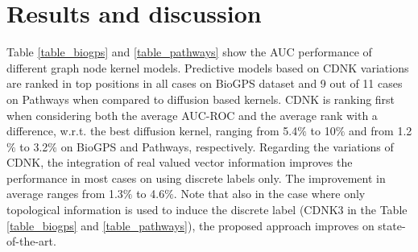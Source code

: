 \documentclass[review]{elsarticle}
\begin{document}
\section{Results and discussion}
Table \ref{table_biogps} and \ref{table_pathways} show the AUC performance of different graph node kernel models. Predictive models based on CDNK variations are ranked in top positions in all cases on BioGPS dataset and 9 out of 11 cases on Pathways when compared to diffusion based kernels. CDNK is ranking first when considering both the average AUC-ROC and the average rank with a difference, w.r.t. the best diffusion kernel, ranging from 5.4$\%$ to 10$\%$ and from 1.2$\%$ to 3.2$\%$ on BioGPS and Pathways, respectively. Regarding the variations of CDNK, the integration of real valued vector information improves the performance in most cases on using discrete labels only. The improvement in average ranges from 1.3$\%$ to 4.6$\%$. Note that also in the case where only topological information is used to induce the discrete label (CDNK3 in the Table \ref{table_biogps} and \ref{table_pathways}), the proposed approach improves on state-of-the-art. 

\end{document}
